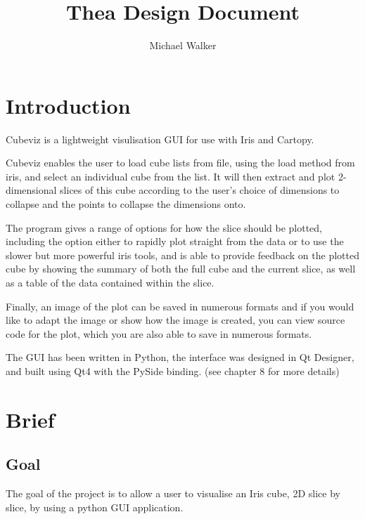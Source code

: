 \documentclass[whitecover]{MO_report}
\begin{document}
\title{Thea Design Document}
\author{Michael Walker}
\maketitle

\tableofcontents

\pagebreak

\chapter{Introduction}

Cubeviz is a lightweight visulisation GUI for use with Iris and Cartopy.

Cubeviz enables the user to load cube lists from file, using the load method
from iris, and select an individual cube from the list. It will then
extract and plot 2-dimensional slices of this cube according to the user's
choice of dimensions to collapse and the points to collapse the dimensions
onto.

The program gives a range of options for how the slice should be plotted,
including the option either to rapidly plot straight from the data or to use
the slower but more powerful iris tools, and is
able to provide feedback on the plotted cube by showing the summary of both the
full cube and the current slice, as well as a table of the data contained
within the slice.

Finally, an image of the plot can be saved in numerous formats and if you would
like to adapt the image or show how the image is created, you can view
source code for the plot, which you are also able to save in numerous formats.

\vspace{4mm}

The GUI has been written in Python, the interface was designed in Qt
Designer, and built using Qt4 with the PySide binding. (see chapter 8 for more
details)

\pagebreak

\chapter{Brief}

\section{Goal}

The goal of the project is to allow a user to visualise an Iris cube, 2D slice
by slice, by using a python GUI application.
\end{document}
